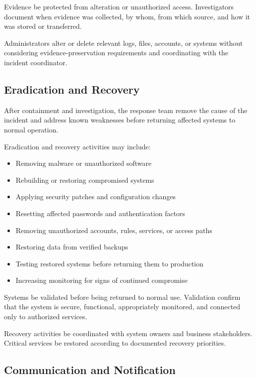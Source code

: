 Evidence \must{} be protected from alteration or unauthorized access. Investigators \should{} document when evidence was collected, by whom, from which source, and how it was stored or transferred.

Administrators \mustnot{} alter or delete relevant logs, files, accounts, or systems without considering evidence-preservation requirements and coordinating with the incident coordinator.

\subsection{Eradication and Recovery}

After containment and investigation, the response team \must{} remove the cause of the incident and address known weaknesses before returning affected systems to normal operation.

Eradication and recovery activities may include:
\begin{itemize}
    \item Removing malware or unauthorized software
    \item Rebuilding or restoring compromised systems
    \item Applying security patches and configuration changes
    \item Resetting affected passwords and authentication factors
    \item Removing unauthorized accounts, rules, services, or access paths
    \item Restoring data from verified backups
    \item Testing restored systems before returning them to production
    \item Increasing monitoring for signs of continued compromise
\end{itemize}

Systems \must{} be validated before being returned to normal use. Validation \should{} confirm that the system is secure, functional, appropriately monitored, and connected only to authorized services.

Recovery activities \must{} be coordinated with system owners and business stakeholders. Critical services \should{} be restored according to documented recovery priorities.

\subsection{Communication and Notification}

